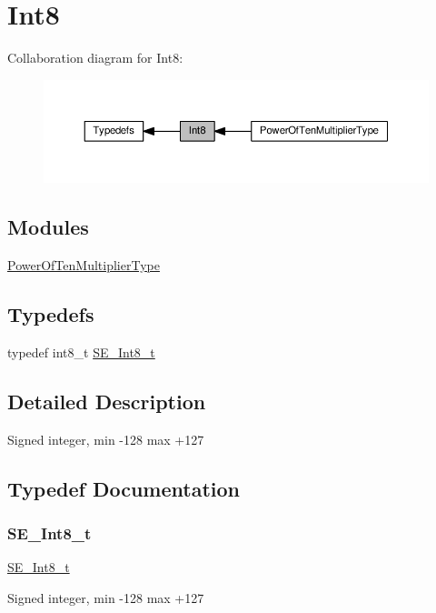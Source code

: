 \hypertarget{group__Int8}{}\section{Int8}
\label{group__Int8}
Collaboration diagram for Int8\+:\nopagebreak
\begin{figure}[H]
\begin{center}
\leavevmode
\includegraphics[width=350pt]{group__Int8}
\end{center}
\end{figure}
\subsection*{Modules}
\begin{DoxyCompactItemize}
\item 
\hyperlink{group__PowerOfTenMultiplierType}{Power\+Of\+Ten\+Multiplier\+Type}
\end{DoxyCompactItemize}
\subsection*{Typedefs}
\begin{DoxyCompactItemize}
\item 
typedef int8\+\_\+t \hyperlink{group__Int8_ga552ff0f4c1c3df56bf665d9b7663148c}{S\+E\+\_\+\+Int8\+\_\+t}
\end{DoxyCompactItemize}


\subsection{Detailed Description}
Signed integer, min -\/128 max +127 

\subsection{Typedef Documentation}
\mbox{\label{group__Int8_ga552ff0f4c1c3df56bf665d9b7663148c}} 
\subsubsection{\texorpdfstring{S\+E\+\_\+\+Int8\+\_\+t}{SE\_Int8\_t}}
{\footnotesize\ttfamily \hyperlink{group__Int8_ga552ff0f4c1c3df56bf665d9b7663148c}{S\+E\+\_\+\+Int8\+\_\+t}}

Signed integer, min -\/128 max +127 